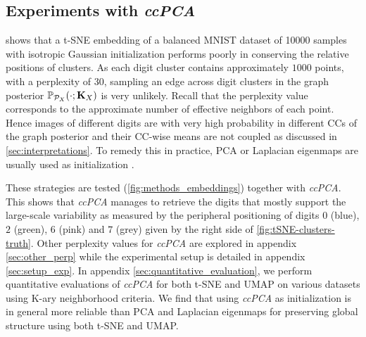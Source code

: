 \subsection{Experiments with \textit{ccPCA}}\label{sec:ccPCA}


 shows that a t-SNE embedding of a balanced MNIST dataset of 10000 samples \cite{deng2012mnist} with isotropic Gaussian initialization performs poorly in conserving the relative positions of clusters. As each digit cluster contains approximately $1000$ points, with a perplexity of $30$, sampling an edge across digit clusters in the graph posterior $\mathbb{P}_{\mathcal{P}_X}(\cdot;\mathbf{K}_{X})$ is very unlikely. Recall that the perplexity value \cite{maaten2008tSNE} corresponds to the approximate number of effective neighbors of each point. Hence images of different digits are with very high probability in different CCs of the graph posterior and their CC-wise means are not coupled as discussed in \cref{sec:interpretations}. To remedy this in practice, PCA or Laplacian eigenmaps are usually used as initialization \cite{kobak2021initialization}. 

These strategies are tested (\cref{fig:methods_embeddings}) together with \textit{ccPCA}. This shows that 
\textit{ccPCA} manages to retrieve the digits that mostly support the large-scale variability as measured by the peripheral positioning of digits $0$ (blue), $2$ (green), $6$ (pink) and $7$ (grey) given by the right side of \cref{fig:tSNE-clusters-truth}. Other perplexity values for \textit{ccPCA} are explored in appendix \ref{sec:other_perp} while the experimental setup is detailed in appendix \ref{sec:setup_exp}. In appendix \ref{sec:quantitative_evaluation}, we perform quantitative evaluations of \textit{ccPCA} for both t-SNE and UMAP on various datasets using K-ary neighborhood criteria. We find that using \textit{ccPCA} as initialization is in general more reliable than PCA and Laplacian eigenmaps for preserving global structure using both t-SNE and UMAP. 

